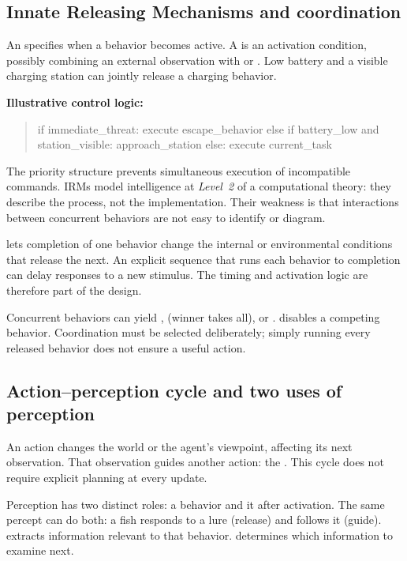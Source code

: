 \subsection{Innate Releasing Mechanisms and coordination}
An  specifies when a behavior becomes active. A  is an activation condition, possibly combining an external observation with  or . Low battery and a visible charging station can jointly release a charging behavior.

\textbf{Illustrative control logic:}
\begin{quote}\ttfamily
if immediate\_threat: execute escape\_behavior\newline
else if battery\_low and station\_visible: approach\_station\newline
else: execute current\_task
\end{quote}
The priority structure prevents simultaneous execution of incompatible commands. IRMs model intelligence at \emph{Level~2} of a computational theory: they describe the process, not the implementation. Their weakness is that interactions between concurrent behaviors are not easy to identify or diagram.

 lets completion of one behavior change the internal or environmental conditions that release the next. An explicit sequence that runs each behavior to completion can delay responses to a new stimulus. The timing and activation logic are therefore part of the design.

Concurrent behaviors can yield ,  (winner takes all), or .  disables a competing behavior. Coordination must be selected deliberately; simply running every released behavior does not ensure a useful action.

\subsection{Action--perception cycle and two uses of perception}
An action changes the world or the agent's viewpoint, affecting its next observation. That observation guides another action: the . This cycle does not require explicit planning at every update.

Perception has two distinct roles:  a behavior and  it after activation. The same percept can do both: a fish responds to a lure (release) and follows it (guide).  extracts information relevant to that behavior.  determines which information to examine next.

